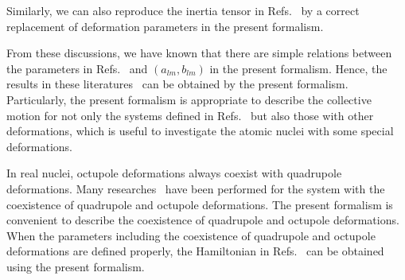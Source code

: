 \documentclass[twocolumn,prc,showpacs,preprintnumbers,superscriptaddress,floatfix]{revtex4}
\begin{document}
Similarly, we can also reproduce the inertia tensor in Refs.~\cite%
{Bizzeti04,Bonatsos05,Bonatsos15} by a correct replacement of deformation
parameters in the present formalism.

From these discussions, we have known that there are simple relations
between the parameters in Refs.~\cite%
{Rohozinski88,Rohozinski90,Hamamoto91,Wexler99} and $\left(
a_{lm},b_{lm}\right) $ in the present formalism. Hence, the results in these
literatures~\cite{Rohozinski88,Rohozinski90,Hamamoto91,Wexler99} can be
obtained by the present formalism. Particularly, the present formalism is
appropriate to describe the collective motion for not only the systems
defined in Refs.~\cite{Rohozinski88,Rohozinski90,Hamamoto91,Wexler99} but
also those with other deformations, which is useful to investigate the
atomic nuclei with some special deformations.

In real nuclei, octupole deformations always coexist with quadrupole
deformations. Many researches~\cite%
{Nazarewicz84,Rohozinski82,Lenis06,Wexler99,Bizzeti04,Bizzeti08,Bizzeti10,Bizzeti13,Bonatsos15,Dzyublik93,Denisov95,Bonatsos05}
have been performed for the system with the coexistence of quadrupole and
octupole deformations. The present formalism is convenient to describe the
coexistence of quadrupole and octupole deformations. When the parameters
including the coexistence of quadrupole and octupole deformations are
defined properly, the Hamiltonian in Refs.~\cite%
{Nazarewicz84,Rohozinski82,Lenis06,Wexler99,Bizzeti04,Bizzeti08,Bizzeti10,Bizzeti13,Bonatsos15,Dzyublik93,Denisov95,Bonatsos05}
can be obtained using the present formalism.
\end{document}
